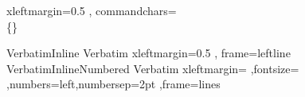 
\newcommand{\jfdm}[1]{\chcomment[id=jfdm]{#1}}
\newcommand{\gallais}[1]{\chcomment[id=gallais]{#1}}

\newcommand{\Velo}{V{\'e}lo\xspace}
\newcommand{\Idris}{Idris~2}
\newcommand{\DeBruijn}{De~Bruijn}

\fvset
{ xleftmargin=0.5\parindent
, commandchars=\\\{\}
}

\DefineVerbatimEnvironment%
  {VerbatimInline}
  {Verbatim}
  {xleftmargin=0.5\parindent
  , frame=leftline
  }
\DefineVerbatimEnvironment%
  {VerbatimInlineNumbered}
  {Verbatim}
  {xleftmargin=\parindent
    ,fontsize=\smaller
    ,numbers=left,numbersep=2pt
    ,frame=lines
  }

